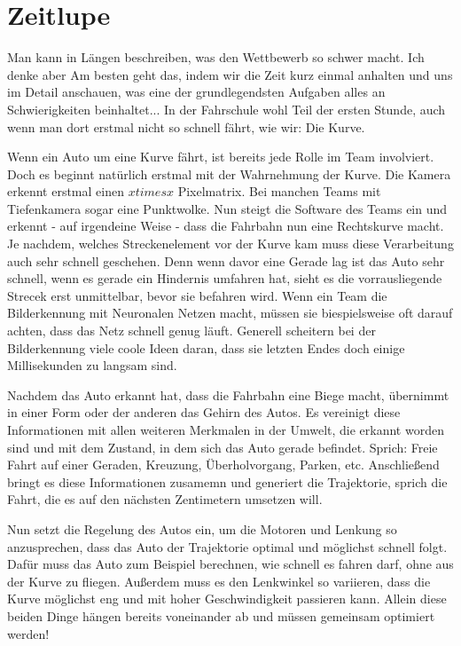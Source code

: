 \section{Zeitlupe}
Man kann in Längen beschreiben, was den Wettbewerb so schwer macht.
Ich denke aber Am besten geht das, indem wir die Zeit kurz einmal 
anhalten und uns im Detail anschauen, was eine der grundlegendsten 
Aufgaben alles an Schwierigkeiten beinhaltet...
In der Fahrschule wohl Teil der ersten Stunde, auch wenn man dort erstmal nicht so schnell fährt, wie wir: Die Kurve.

Wenn ein Auto um eine Kurve fährt, ist bereits jede Rolle im Team involviert.
Doch es beginnt natürlich erstmal mit der Wahrnehmung der Kurve.
Die Kamera erkennt erstmal einen $x times x$ Pixelmatrix.
Bei manchen Teams mit Tiefenkamera sogar eine Punktwolke. 
Nun steigt die Software des Teams ein und erkennt - auf irgendeine Weise -
dass die Fahrbahn nun eine Rechtskurve macht. 
Je nachdem, welches Streckenelement vor der Kurve kam muss diese Verarbeitung auch 
sehr schnell geschehen. Denn wenn davor eine Gerade lag ist das Auto sehr schnell,
wenn es gerade ein Hindernis umfahren hat, sieht es die vorrausliegende Strecek erst
unmittelbar, bevor sie befahren wird. 
Wenn ein Team die Bilderkennung mit Neuronalen Netzen macht, müssen sie biespielsweise
oft darauf achten, dass das Netz schnell genug läuft.
Generell scheitern bei der Bilderkennung viele coole Ideen daran, dass sie 
letzten Endes doch einige Millisekunden zu langsam sind. 

Nachdem das Auto erkannt hat, dass die Fahrbahn eine Biege macht, übernimmt
in einer Form oder der anderen das Gehirn des Autos. 
Es vereinigt diese Informationen mit allen weiteren Merkmalen in der Umwelt,
die erkannt worden sind und mit dem Zustand, in dem sich das Auto gerade befindet. 
Sprich: Freie Fahrt auf einer Geraden, Kreuzung, Überholvorgang, Parken, etc.
Anschließend bringt es diese Informationen zusamemn und generiert die Trajektorie, sprich die Fahrt, die es
auf den nächsten Zentimetern umsetzen will. 

Nun setzt die Regelung des Autos ein, um die Motoren und Lenkung so 
anzusprechen, dass das Auto der Trajektorie optimal und möglichst schnell folgt.
Dafür muss das Auto zum Beispiel berechnen, wie schnell es fahren darf, ohne aus der Kurve zu fliegen.
Außerdem muss es den Lenkwinkel so variieren, dass die Kurve möglichst eng und mit hoher Geschwindigkeit passieren kann.
Allein diese beiden Dinge hängen bereits voneinander ab und müssen gemeinsam optimiert werden!

